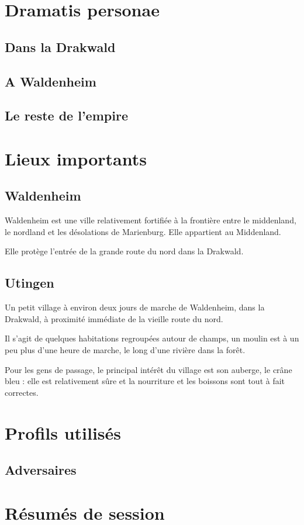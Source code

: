 \documentclass[10pt,a4paper]{book}
\begin{document}
\chapter{Dramatis personae}
\section{Dans la Drakwald}
\section{A Waldenheim}
\section{Le reste de l'empire}

\chapter{Lieux importants}
\section{Waldenheim}
Waldenheim est une ville relativement fortifiée à la frontière entre le middenland, le nordland et les désolations de Marienburg. Elle appartient au Middenland.

Elle protège l'entrée de la grande route du nord dans la Drakwald.
\section{Utingen}
Un petit village à environ deux jours de marche de Waldenheim, dans la Drakwald, à proximité immédiate de la vieille route du nord. 

Il s'agit de quelques habitations regroupées autour de champs, un moulin est à un peu plus d'une heure de marche, le long d'une rivière dans la forêt. 

Pour les gens de passage, le principal intérêt du village est son auberge, le crâne bleu : elle est relativement sûre et la nourriture et les boissons sont tout à fait correctes.
\chapter{Profils utilisés}
\section{Adversaires}

\chapter{Résumés de session}
\end{document}
